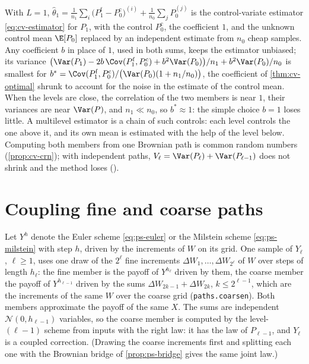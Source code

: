 \begin{remark}\label{rem:ml-control}
With $L=1$, $\hat\theta_1=\frac1{n_1}\sum_i\big(P^{\mathrm f}_1-P^{\mathrm c}_0\big)^{(i)}+\frac1{n_0}\sum_jP_0^{(j)}$
is the control-variate estimator \eqref{eq:cv-estimator} for $P_1$, with the control
$P^{\mathrm c}_0$, the coefficient $1$, and the unknown control mean $\E[P_0]$ replaced by an
independent estimate from $n_0$ cheap samples. Any coefficient $b$ in place of $1$, used in both
sums, keeps the estimator unbiased; its variance
$\big(\Var(P_1)-2b\,\Cov(P^{\mathrm f}_1,P^{\mathrm c}_0)+b^2\Var(P_0)\big)/n_1+b^2\Var(P_0)/n_0$ is
smallest for $b^*=\Cov(P^{\mathrm f}_1,P^{\mathrm c}_0)/\big(\Var(P_0)(1+n_1/n_0)\big)$, the
coefficient of \cref{thm:cv-optimal} shrunk to account for the noise in the estimate of the control
mean. When the levels are close, the correlation of the two members is near $1$, their variances are
near $\Var(P)$, and $n_1\ll n_0$, so $b^*\approx1$: the simple choice $b=1$ loses little. A multilevel estimator
is a chain of such controls: each level controls the one above it, and its own mean is
estimated with the help of the level below. Computing both members from one Brownian path is
common random numbers (\cref{prop:cv-crn}); with independent paths,
$V_\ell=\Var(P_\ell)+\Var(P_{\ell-1})$ does not shrink and the method loses
().
\end{remark}

\section{Coupling fine and coarse paths}\label{sec:ml-coupling}

Let $Y^h$ denote the Euler scheme \eqref{eq:ps-euler} or the Milstein scheme
\eqref{eq:ps-milstein} with step $h$, driven by the increments of $W$ on its grid. One sample of
$Y_\ell$, $\ell\ge1$, uses one draw of the $2^\ell$ fine increments
$\Delta W_1,\dots,\Delta W_{2^\ell}$ of $W$ over steps of length $h_\ell$: the fine member is
the payoff of $Y^{h_\ell}$ driven by them, the coarse member the payoff of $Y^{h_{\ell-1}}$ driven
by the sums $\Delta W_{2k-1}+\Delta W_{2k}$, $k\le2^{\ell-1}$, which are the increments of the same
$W$ over the coarse grid (\texttt{paths.coarsen}). Both members approximate the payoff of the
same $X$. The sums are independent $\mathcal N(0,h_{\ell-1})$ variables, so the coarse member
is computed by the level-$(\ell-1)$ scheme from inputs with the right law: it has the law of
$P_{\ell-1}$, and $Y_\ell$ is a coupled correction. (Drawing the coarse increments first and
splitting each one with the Brownian bridge of \cref{prop:ps-bridge} gives the same joint law.)

